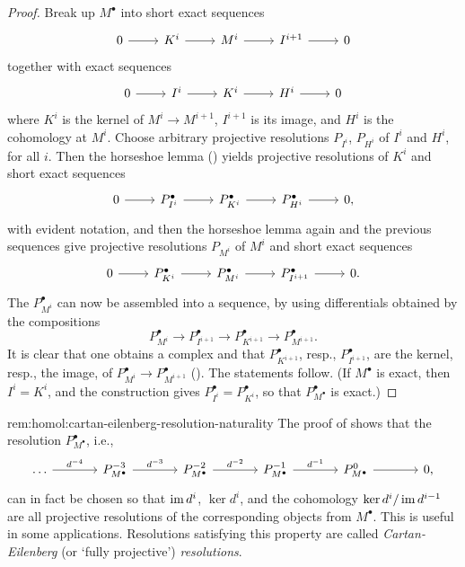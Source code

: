 \begin{proof}
  Break up $M^\bullet$ into short exact sequences
  \[\begin{tikzcd}
      0 \arrow[r] & K^i \arrow[r] & M^i \arrow[r] & I^{i+1} \arrow[r]
      & 0
    \end{tikzcd}\] together with exact sequences
  \[\begin{tikzcd}
      0 \arrow[r] & I^i \arrow[r] & K^i \arrow[r] & H^i \arrow[r] & 0
    \end{tikzcd}\] where $K^i$ is the kernel of $M^i \to M^{i+1}$,
  $I^{i+1}$ is its image, and $H^i$ is the cohomology at $M^i$. Choose
  arbitrary projective resolutions $P_{I^i}$, $P_{H^i}$ of $I^i$ and
  $H^i$, for all $i$. Then the horseshoe lemma
  () yields projective resolutions of $K^i$
  and short exact sequences
  \[\begin{tikzcd}
      0 \arrow[r] & P_{I^i}^\bullet \arrow[r] & P_{K^i}^\bullet
      \arrow[r] & P_{H^i}^\bullet \arrow[r] & 0,
    \end{tikzcd}\] with evident notation, and then the horseshoe lemma
  again and the previous sequences give projective resolutions
  $P_{M^i}$ of $M^i$ and short exact sequences
  \[\begin{tikzcd}
      0 \arrow[r] & P_{K^i}^\bullet \arrow[r] & P_{M^i}^\bullet
      \arrow[r] & P_{I^{i+1}}^\bullet \arrow[r] & 0.
    \end{tikzcd}\] The $P_{M^i}^\bullet$ can now be assembled into a
  sequence, by using differentials obtained by the compositions
  \[
    P_{M^i}^\bullet \to P_{I^{i+1}}^\bullet \to P_{K^{i+1}}^\bullet
    \to P_{M^{i+1}}^\bullet.
  \]
  It is clear that one obtains a complex and that
  $P_{K^{i+1}}^\bullet$, resp., $P_{I^{i+1}}^\bullet$, are the kernel,
  resp., the image, of $P_{M^i}^\bullet \to P_{M^{i+1}}^\bullet$
  (). The
  statements follow. (If $M^\bullet$ is exact, then $I^i = K^i$, and
  the construction gives $P_{I^i}^\bullet = P_{K^i}^\bullet$, so that
  $P_{M^\bullet}^\bullet$ is exact.)
\end{proof}

\begin{rem}{}{rem:homol:cartan-eilenberg-resolution-naturality}
  The proof of  shows that the
  resolution $P_{M^\bullet}^\bullet$, i.e.,
  \[\begin{tikzcd}[column sep=large]
      \dots \arrow[r, "d^{-4}"] & P_{M^\bullet}^{-3} \arrow[r,
      "d^{-3}"] & P_{M^\bullet}^{-2} \arrow[r, "d^{-2}"] &
      P_{M^\bullet}^{-1} \arrow[r, "d^{-1}"] & P_{M^\bullet}^0
      \arrow[r] & 0,
    \end{tikzcd}\] can in fact be chosen so that $\operatorname{im} d^i$,
  $\ker d^i$, and the cohomology $\ker d^i / \operatorname{im} d^{i-1}$ are all
  projective resolutions of the corresponding objects from
  $M^\bullet$. This is useful in some applications. Resolutions
  satisfying this property are called \emph{Cartan-Eilenberg} (or
  `fully projective') \emph{resolutions}.
\end{rem}


